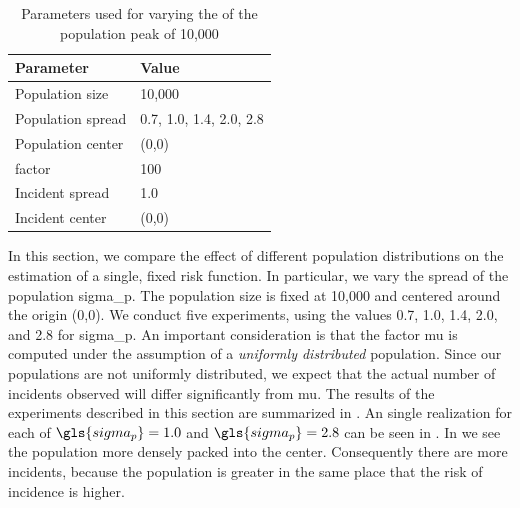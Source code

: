 \begin{table}[htbp]
    \centering
    \begin{tabular}{ll}
        \toprule
        Parameter & Value \\
        \midrule
        Population size & 10,000 \\
        Population \gls{spread} & 0.7, 1.0, 1.4, 2.0, 2.8 \\
        Population center & (0,0) \\
        \Gls{factor} & 100 \\
        Incident \gls{spread} & 1.0 \\
        Incident center & (0,0) \\
        \bottomrule
    \end{tabular}
    \caption{Parameters used for varying the  of the population peak of 10,000}
    \label{tab:params:pop_spread}
\end{table}

In this section, we compare the effect of different population distributions on the estimation of a single, fixed risk function.
In particular, we vary the \gls{spread} of the population \gls{sigma_p}.
The population size is fixed at 10,000 and centered around the origin (0,0).
We conduct five experiments, using the values 0.7, 1.0, 1.4, 2.0, and 2.8 for \gls{sigma_p}.
An important consideration is that the \gls{factor} \gls{mu} is computed under the assumption of a \textit{uniformly distributed} population.
Since our populations are not uniformly distributed, we expect that the actual number of incidents observed will differ significantly from \gls{mu}.
The results of the experiments described in this section are summarized in .
An single realization for each of $\gls{sigma_p} = 1.0$ and $\gls{sigma_p} = 2.8$ can be seen in .
In  we see the population more densely packed into the center.
Consequently there are more incidents,
because the population is greater in the same place that the risk of incidence is higher.

